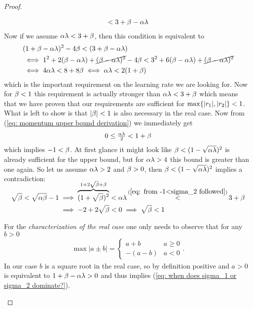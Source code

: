 \begin{proof}
\begin{description}[wide, labelindent=0pt]
\begin{align}
			< 3+\beta-\alpha\lambda
		\end{align}
		Now if we assume \(\alpha\lambda < 3+\beta\), then this condition is
		equivalent to 
		\begin{align}
			\nonumber
			&(1+\beta-\alpha\lambda)^2 - 4\beta < (3+\beta-\alpha\lambda)\\
			\nonumber
			&\iff 1^2 + 2(\beta-\alpha\lambda) + \cancel{(\beta-\alpha\lambda)^2} - 4\beta
			< 3^2 + 6(\beta-\alpha\lambda) + \cancel{(\beta-\alpha\lambda)^2}\\
			\label{eq: momentum upper bound derivation}
			&\iff 4\alpha\lambda < 8 + 8\beta
			\iff \alpha\lambda < 2(1+\beta)
		\end{align}
		which is the important requirement on the learning rate we are looking for.
		Now for \(\beta<1\) this requirement is actually stronger than
		\(\alpha\lambda <3+\beta\) which means that we have proven that our
		requirements are sufficient for \(\max\{|r_1|,|r_2|\}<1\).
		What is left to show is that \(|\beta|<1\) is also necessary in the real
		case. Now from (\ref{eq: momentum upper bound derivation}) we immediately
		get
		\begin{align*}
			0 \le \tfrac{\alpha\lambda}2 < 1+\beta
		\end{align*}
		which implies \(-1 < \beta\). At first glance it might look like
		\(\beta<(1-\sqrt{\alpha\lambda})^2\) is already sufficient for the upper
		bound, but for \(\alpha\lambda>4\) this bound is greater than one again.
		So let us assume \(\alpha\lambda>2\) and \(\beta>0\), then
		\(\beta<(1-\sqrt{\alpha\lambda})^2\) implies a contradiction:
		\begin{align*}
			\sqrt{\momCoeff} < \sqrt{\lrSq\momCoeff} -1
			&\implies \smash{\overbrace{(1+\sqrt{\momCoeff})^2}^{1+2\sqrt{\momCoeff} + \momCoeff}}
			< \lrSq\hesseEV
			\stackrel{(\ref{eq: from -1<sigma_2 followed})}{<} 3+\momCoeff \\
			&\implies -2 +2\sqrt{\momCoeff} < 0
			\implies \sqrt{\momCoeff} < 1
		\end{align*}

		For the \emph{characterization of the real case} one only needs to observe
		that for any \(b>0\)
		\begin{align}
			\max|a\pm b| = \begin{cases}
				a + b & a \ge 0\\
				-(a-b) & a < 0
			\end{cases}.
		\end{align}
		In our case \(b\) is a square root in the real case, so by definition
		positive and \(a>0\) is equivalent to \(1+\beta - \alpha\lambda >0\)
		and thus implies (\ref{eq: when does sigma_1 or sigma_2 dominate?}).
		

\end{description}
\end{proof}

